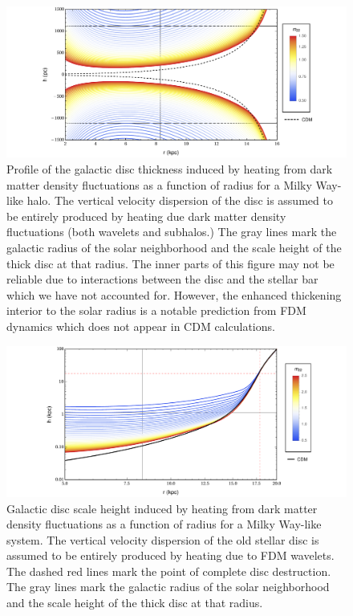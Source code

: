 \documentclass[usenatbib]{mnras}
\begin{document}
\begin{figure}
\includegraphics[width=18cm]{disk_shape}
\vspace*{-5mm}
\caption{Profile of the galactic disc thickness induced by {\color{magenta} heating from dark matter density fluctuations} as a function of radius for a Milky Way-like halo. {\color{red} The vertical velocity dispersion of the disc is assumed to be entirely produced by heating due dark matter density fluctuations (both wavelets and subhalos.) The gray lines mark the galactic radius of the solar neighborhood and the scale height of the thick disc at that radius. The inner parts of this figure may not be reliable due to interactions between the disc and the {\color{magenta} stellar bar} which we have not accounted for. However, the enhanced thickening interior to the solar radius is a notable prediction from FDM dynamics which does not appear in CDM calculations. } }
\label{fig:disc_shape_FDM}
\end{figure}

\begin{figure}
\includegraphics[width=18cm]{disk_scale_height}
\vspace*{-5mm}
\caption{Galactic disc scale height induced by {\color{magenta} heating from dark matter density fluctuations} as a function of radius for a Milky Way-like {\color{magenta} system}. The vertical velocity dispersion of the {\color{magenta} old stellar disc} is assumed to be entirely produced by heating due to FDM wavelets. {\color{red} The dashed red lines mark the point of complete disc destruction. The gray lines mark the galactic radius of the solar neighborhood and the scale height of the thick disc at that radius.} }
\label{fig:disc_scale_height}
\end{figure}
\end{document}
